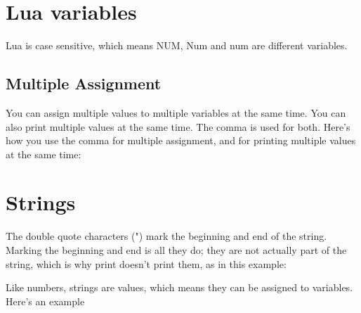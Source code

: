 \section{Lua variables}

\begin{tcblisting}{}
\end{tcblisting}

Lua is case sensitive, which means NUM, Num and num are different variables.

\begin{tcblisting}{}
\end{tcblisting}


\subsection{Multiple Assignment}

You can assign multiple values to multiple variables at the same time. You can also print multiple values
at the same time. The comma is used for both. Here’s how you use the comma for multiple assignment,
and for printing multiple values at the same time:

\begin{tcblisting}{}
\end{tcblisting}



\section{Strings}
The double quote characters (") mark the beginning and end of the string. Marking the beginning and
end is all they do; they are not actually part of the string, which is why print doesn't print them, as in
this example:

\begin{tcblisting}{}
\end{tcblisting}

Like numbers, strings are values, which means they can be assigned to variables. Here's an example

\begin{tcblisting}{}
\end{tcblisting}

